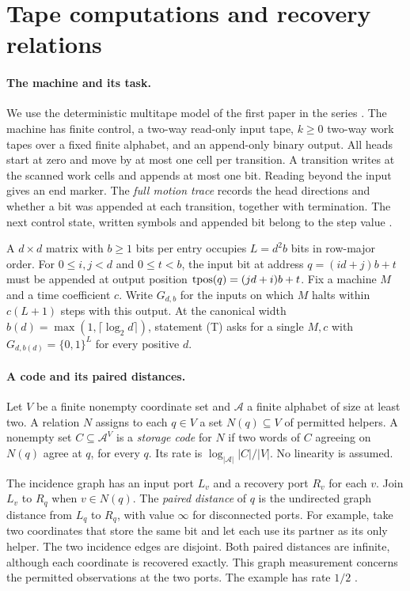 \section{Tape computations and recovery relations}\label{sec:model}

\paragraph{The machine and its task.}
We use the deterministic multitape model of the first paper in the series
\cite{PaperOne}. The machine has finite control, a two-way read-only input
tape, $k\ge0$ two-way work tapes over a fixed finite alphabet, and an
append-only binary output. All heads start at zero and move by at most one
cell per transition. A transition writes at the scanned work cells and
appends at most one bit. Reading beyond the input gives an end marker.
The \emph{full motion trace} records the head directions and whether a bit
was appended at each transition, together with termination. The next control state, written symbols and appended bit belong to the
step value \cite[\S2]{PaperEleven}.

A $d\times d$ matrix with $b\ge1$ bits per entry occupies $L=d^2b$ bits in
row-major order. For $0\le i,j<d$ and $0\le t<b$, the input bit at address
$q=(id+j)b+t$ must be appended at output position
$\operatorname{tpos}(q)=(jd+i)b+t$. Fix a machine $M$ and a time coefficient $c$.
Write $G_{d,b}$ for the inputs on which $M$ halts within $c(L+1)$ steps
with this output. At the canonical width $b(d)=\max(1,\lceil\log_2 d\rceil)$,
statement \textnormal{(T)} asks for a single $M,c$ with
$G_{d,b(d)}=\{0,1\}^L$ for every positive $d$.

\paragraph{A code and its paired distances.}
Let $V$ be a finite nonempty coordinate set and $\mathcal A$ a finite
alphabet of size at least two. A relation $N$ assigns to each $q\in V$
a set $N(q)\subseteq V$ of permitted helpers. A nonempty set
$C\subseteq\mathcal A^V$ is a \emph{storage code} for $N$ if two words of
$C$ agreeing on $N(q)$ agree at $q$, for every $q$. Its rate is
$\log_{|\mathcal A|}|C|/|V|$. No linearity is assumed.

The incidence graph has an input port $L_v$ and a recovery port $R_v$
for each $v$. Join $L_v$ to $R_q$ when $v\in N(q)$. The \emph{paired
distance} of $q$ is the undirected graph distance from $L_q$ to $R_q$,
with value $\infty$ for disconnected ports. For example, take two
coordinates that store the same bit and let each use its partner as its
only helper. The two incidence edges are disjoint. Both paired distances
are infinite, although each coordinate is recovered exactly. This graph
measurement concerns the permitted observations at the two ports. The example has rate $1/2$ \cite[\S3]{PaperFive}.

